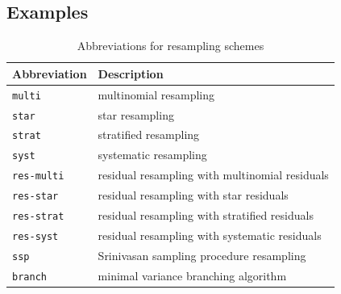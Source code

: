 \subsection{Examples \seb{$\sim$} }\label{sec:examples_resamplingschemes}

\begin{table}[ht]
\centering
\begin{tabular}{ l l }
\hline\hline
Abbreviation & Description \\%
\hline
\texttt{multi} & multinomial resampling \\%
\texttt{star} & star resampling \\%
\texttt{strat} & stratified resampling \\%
\texttt{syst} & systematic resampling \\%
\texttt{res-multi} & residual resampling with multinomial residuals \\
\texttt{res-star} & residual resampling with star residuals \\
\texttt{res-strat} & residual resampling with stratified residuals \\
\texttt{res-syst} & residual resampling with systematic residuals \\
\texttt{ssp} & Srinivasan sampling procedure resampling \\%
\texttt{branch} & minimal variance branching algorithm \\%
\hline\hline
\end{tabular}
\caption{Abbreviations for resampling schemes}
\label{tab:resampling_abbrevs}
\end{table} 


 
